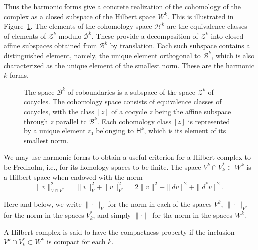{Thus the harmonic forms give a concrete realization of the cohomology of the complex as a closed subspace of the Hilbert space $W^k$. This is illustrated in Figure~\ref{fig:cohomology-harmonic-representatives}. The elements of the cohomology space $\mathcal H^k$ are the equivalence classes of elements of $\mathcal Z^k$ modulo $\mathcal B^k$. These provide a decomposition of $\mathcal Z^k$ into closed affine subspaces obtained from $\mathcal B^k$ by translation. Each such subspace contains a distinguished element, namely, the unique element orthogonal to $\mathcal B^k$, which is also characterized as the unique element of the smallest norm. These are the harmonic $k$-forms.}

\begin{figure}[htbp]\centering

\caption{{The space $\mathcal B^k$ of coboundaries is a subspace of the space $\mathcal Z^k$ of cocycles. The cohomology space consists of equivalence classes of cocycles, with the class $[z]$ of a cocycle $z$ being the affine subspace through $z$ parallel to $\mathcal B^k$. Each cohomology class $[z]$ is represented by a unique element $z_0$ belonging to $\mathsf H^k$, which is its element of its smallest norm.}}\label{fig:cohomology-harmonic-representatives}
\end{figure}

{We may use harmonic forms to obtain a useful criterion for a Hilbert complex to be Fredholm, i.e., for its homology spaces to be finite. The space $V^k\cap V_k^*\subset W^k$ is a Hilbert space when endowed with the norm}
\[
\|v\|_{V\cap V^*}^2=\|v\|_V^2+\|v\|_{V^*}^2=2\|v\|^2+\|dv\|^2+\|d^*v\|^2.
\]

{Here and below, we write $\|\cdot\|_V$ for the norm in each of the spaces $V^k$, $\|\cdot\|_{V^*}$ for the norm in the spaces $V_k^*$, and simply $\|\cdot\|$ for the norm in the spaces $W^k$.}

\begin{Definition}\label{def:hilbert-complex-compactness-property}
{A Hilbert complex is said to have the compactness property if the inclusion $V^k\cap V_k^*\subset W^k$ is compact for each $k$.}
\end{Definition}

